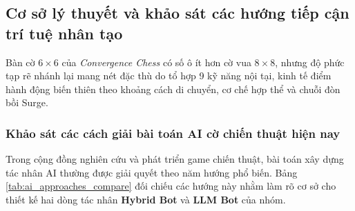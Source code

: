 \subsection{Cơ sở lý thuyết và khảo sát các hướng tiếp cận trí tuệ nhân tạo}
Bàn cờ $6 \times 6$ của \textit{Convergence Chess} có số ô ít hơn cờ vua $8 \times 8$, nhưng độ phức tạp rẽ nhánh lại mang nét đặc thù do tổ hợp 9 kỹ năng nội tại, kinh tế điểm hành động biến thiên theo khoảng cách di chuyển, cơ chế hợp thể và chuỗi đòn bồi Surge.

\subsubsection{Khảo sát các cách giải bài toán AI cờ chiến thuật hiện nay}
Trong cộng đồng nghiên cứu và phát triển game chiến thuật, bài toán xây dựng tác nhân AI thường được giải quyết theo năm hướng phổ biến. Bảng \ref{tab:ai_approaches_compare} đối chiếu các hướng này nhằm làm rõ cơ sở cho thiết kế hai dòng tác nhân \textbf{Hybrid Bot} và \textbf{LLM Bot} của nhóm.

